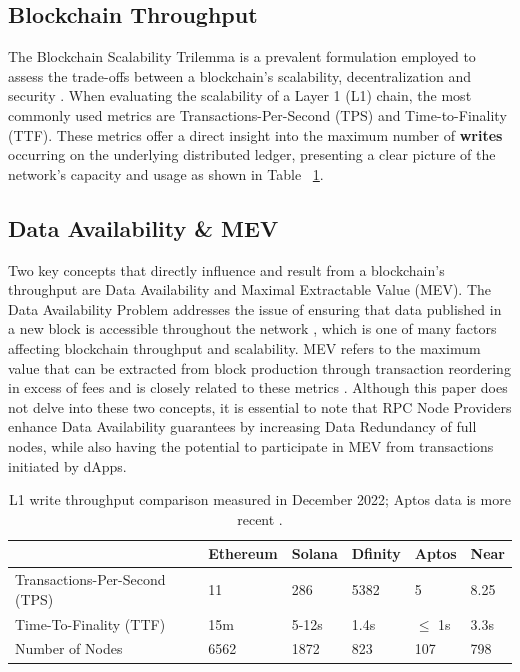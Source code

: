 \documentclass[runningheads]{llncs}
\begin{document}
\subsection{Blockchain Throughput}

The Blockchain Scalability Trilemma is a prevalent formulation employed to assess the trade-offs between a blockchain's scalability, decentralization and security \cite{vitalikShardingGreat}. When evaluating the scalability of a Layer 1 (L1) chain, the most commonly used metrics are Transactions-Per-Second (TPS) and Time-to-Finality (TTF). These metrics offer a direct insight into the maximum number of \textbf{writes} occurring on the underlying distributed ledger, presenting a clear picture of the network's capacity and usage as shown in Table ~\ref{l1-throughput}.

\subsection{Data Availability \& MEV}

Two key concepts that directly influence and result from a blockchain's throughput are Data Availability and Maximal Extractable Value (MEV). The Data Availability Problem addresses the issue of ensuring that data published in a new block is accessible throughout the network \cite{coinmarketcapWhatData}, which is one of many factors affecting blockchain throughput and scalability. MEV refers to the maximum value that can be extracted from block production through transaction reordering in excess of fees and is closely related to these metrics \cite{ethereumMaximalExtractable}. Although this paper does not delve into these two concepts, it is essential to note that RPC Node Providers enhance Data Availability guarantees by increasing Data Redundancy of full nodes, while also having the potential to participate in MEV from transactions initiated by dApps.


\begin{table}
    \centering    
    \caption{L1 write throughput comparison measured in December 2022; Aptos data is more recent \cite{internetcomputerComparisonInternet} \cite{aptoslabsAptosExplorer}.}    
    \label{l1-throughput}    
    \begin{tabular}{|l|P{1.5cm}|P{1.2cm}|P{1.2cm}|P{1.1cm}|P{1cm}|}
        \hline & Ethereum & Solana & Dfinity & Aptos & Near \\
        \hline
            Transactions-Per-Second (TPS) & 11 & 286 & 5382 & 5 & 8.25  \\
            Time-To-Finality (TTF) &  15m & 5-12s & 1.4s & $\le$ 1s & 3.3s \\
            Number of Nodes &  6562 & 1872 &  823 & 107 & 798 \\
        \hline
    \end{tabular}
\end{table}
\end{document}
